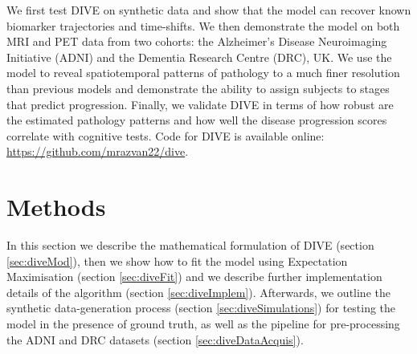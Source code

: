 We first test DIVE on synthetic data and show that the model can recover known biomarker trajectories and time-shifts. We then demonstrate the model on both MRI and PET data from two cohorts: the Alzheimer's Disease Neuroimaging Initiative (ADNI) and the Dementia Research Centre (DRC), UK. We use the model to reveal spatiotemporal patterns of pathology to a much finer resolution than previous models and demonstrate the ability to assign subjects to stages that predict progression. Finally, we validate DIVE in terms of how robust are the estimated pathology patterns and how well the disease progression scores correlate with cognitive tests. Code for DIVE is available online: \url{https://github.com/mrazvan22/dive}.


\section{Methods}
\label{sec:diveMet}

In this section we describe the mathematical formulation of DIVE (section \ref{sec:diveMod}), then we show how to fit the model using Expectation Maximisation (section \ref{sec:diveFit}) and we describe further implementation details of the algorithm (section \ref{sec:diveImplem}). Afterwards, we outline the synthetic data-generation process (section \ref{sec:diveSimulations}) for testing the model in the presence of ground truth, as well as the pipeline for pre-processing the ADNI and DRC datasets (section \ref{sec:diveDataAcquis}).

